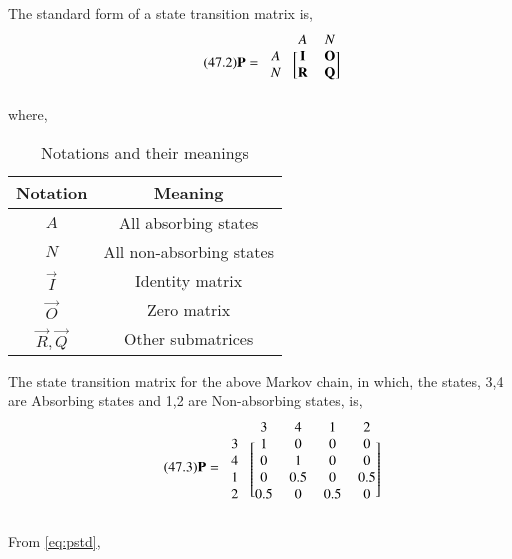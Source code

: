 \documentclass[journal,12pt,twocolumn]{IEEEtran}
\begin{document}
\newline
\begin{definition}
The standard form of a state transition matrix is,
\begin{align}
\tag{47.2}
\label{eq:std}
   \vec{P}=\begin{blockarray}{ccc}
&A & N \\
\begin{block}{c[cc]}
  A & \vec{I} & \vec{O}  \\
  N & \vec{R} & \vec{Q} \\
\end{block}
\end{blockarray}
\end{align}
where,
\newpage
\begin{table}[h!]
\centering
\caption{Notations and their meanings}
\label{table:2}
\begin{tabular}{|c|c|}
    \hline
    Notation & Meaning \\
    \hline
    $A$ & All absorbing states\\[1ex]
    \hline
    $N$ & All non-absorbing states\\[1ex]
    \hline
    $\vec{I}$ & Identity matrix\\[1ex]
    \hline
    $\vec{O}$ & Zero matrix\\[1ex]
    \hline
    $\vec{R},\vec{Q}$ & Other submatrices\\[1ex]
    \hline
\end{tabular}
\end{table}
\end{definition}
\begin{corollary}
The state transition matrix for the above Markov chain, in which, the states, 3,4 are Absorbing states and 1,2 are Non-absorbing states, is, 
\begin{align}
\tag{47.3}
\label{eq:pstd}
    \vec{P}=\begin{blockarray}{cccccc}
& 3 & 4 & 1 & 2 \\
\begin{block}{c[ccccc]}
  3 & 1 & 0 & 0 & 0 \\
  4 & 0 & 1 & 0 & 0 \\
  1 & 0 & 0.5 & 0 & 0.5  \\
  2 & 0.5 & 0 & 0.5 & 0  \\
\end{block}
\end{blockarray}
\end{align}
\end{corollary}
From \eqref{eq:pstd},
\end{document}
